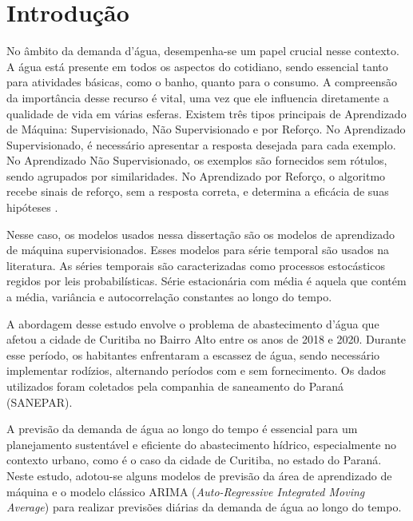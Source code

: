 



\section{Introdu{\c c}{\~a}o} \label{sec:int}


No âmbito da demanda d'água, desempenha-se um papel crucial nesse contexto. A água está presente em todos os aspectos do cotidiano, sendo essencial tanto para atividades básicas, como o banho, quanto para o consumo. A compreensão da importância desse recurso é vital, uma vez que ele influencia diretamente a qualidade de vida em várias esferas.
Existem três tipos principais de Aprendizado de Máquina: Supervisionado, Não Supervisionado e por Reforço. No Aprendizado Supervisionado, é necessário apresentar a resposta desejada para cada exemplo. No Aprendizado Não Supervisionado, os exemplos são fornecidos sem rótulos, sendo agrupados por similaridades. No Aprendizado por Reforço, o algoritmo recebe sinais de reforço, sem a resposta correta, e determina a eficácia de suas hipóteses \cite{Silva2021}.

Nesse caso, os modelos usados nessa dissertação são os modelos de aprendizado de máquina supervisionados. Esses modelos para série temporal são usados na literatura.
As séries temporais são caracterizadas como processos estocásticos regidos por leis probabilísticas.
Série estacionária com média é aquela que contém a média, variância e autocorrelação constantes ao longo do tempo.



%

%
A abordagem desse estudo envolve o problema de abastecimento d'água que afetou a cidade de Curitiba no Bairro Alto entre os anos de 2018 e 2020. Durante esse período, os habitantes enfrentaram a escassez de água, sendo necessário implementar rodízios, alternando períodos com e sem fornecimento. Os dados utilizados foram coletados pela companhia de saneamento do Paraná (SANEPAR).


A previsão da demanda de água ao longo do tempo é essencial para um planejamento sustentável e eficiente do abastecimento hídrico, especialmente no contexto urbano, como é o caso da cidade de Curitiba, no estado do Paraná. Neste estudo, adotou-se alguns modelos de previsão da área de aprendizado de máquina e o modelo clássico ARIMA (\textit{Auto-Regressive Integrated Moving Average}) para realizar previsões diárias da demanda de água ao longo do tempo.

